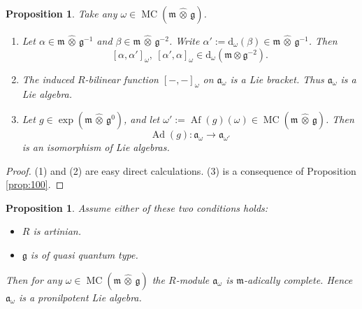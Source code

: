 \documentclass[a4paper,10pt]{amsart}
\newtheorem{prop}[equation]{Proposition}
\theoremstyle{definition}
\numberwithin{equation}{section}
\newcommand{\opn}{\operatorname}
\newcommand{\rmitem}[1]{\item[\text{\textup{(#1)}}]}
\newcommand{\mfrak}[1]{\mathfrak{#1}}
\newcommand{\mrm}[1]{\mathrm{#1}}
\newcommand{\tup}[1]{\textup{#1}}
\newcommand{\ot}{\otimes}
\newcommand{\what}[1]{\widehat{#1}}
\newcommand{\hatotimes}{\, \what{\otimes} \,}
\newcommand{\hot}{\hatotimes}
\newcommand{\g}{\mfrak{g}}
\newcommand{\m}{\mfrak{m}}
\renewcommand{\a}{\mfrak{a}}
\renewcommand{\d}{\mrm{d}}
\newcommand{\om}{\omega}
\newcommand{\al}{\alpha}
\newcommand{\be}{\beta}
\begin{document}
\begin{prop} \label{prop:110}
Take any $\om \in \opn{MC}(\m \hot \g)$.
\begin{enumerate}
\item Let $\al \in \m \hot \g^{-1}$ and 
$\be \in \m \hot \g^{-2}$.
Write $\al' := \d_{\om}(\be) \in \m \hot \g^{-1}$.
Then 
\[ [\al, \al']_{\om} , \ [\al', \al]_{\om} \in \d_{\om}(\m \ot \g^{-2}) . \]

\item The induced $R$-bilinear function $[-,-]_{\om}$ on $\a_{\om}$ is a Lie
bracket. Thus $\a_{\om}$ is a Lie algebra.

\item Let $g \in \opn{exp}(\m \hot \g^0)$, and let 
$\om' := \opn{Af}(g)(\om) \in \opn{MC}(\m \hot \g)$. Then 
\[ \opn{Ad}(g) : \a_{\om} \to \a_{\om'} \]
is an isomorphism of Lie algebras.
\end{enumerate}
\end{prop}

\begin{proof}
(1) and (2) are easy direct calculations. (3) is a consequence of Proposition
\ref{prop:100}.
\end{proof}

\begin{prop} \label{prop:103}
Assume either of these two conditions holds\tup{:}
\begin{itemize}
\rmitem{i} $R$ is artinian.  
\rmitem{ii} $\g$ is of quasi quantum type.
\end{itemize}
Then for any $\om \in \opn{MC}(\m \hot \g)$ the 
$R$-module $\a_{\om}$ is $\m$-adically complete. Hence 
$\a_{\om}$ is a pronilpotent Lie algebra.
\end{prop}
\end{document}

